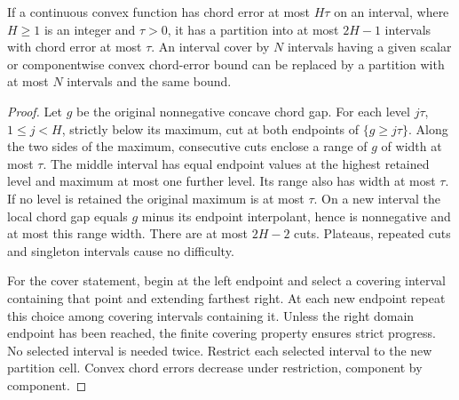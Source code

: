 \begin{lemma}\label{lem:level-refinement}
If a continuous convex function has chord error at most $H\tau$ on an
interval, where $H\ge1$ is an integer and $\tau>0$, it has a partition
into at most $2H-1$ intervals with chord error at most $\tau$.
An interval cover by $N$ intervals having a given scalar or componentwise
convex chord-error bound can be replaced by a partition with at most
$N$ intervals and the same bound.
\end{lemma}
\begin{proof}
Let $g$ be the original nonnegative concave chord gap. For each level
$j\tau$, $1\le j<H$, strictly below its maximum, cut at both endpoints
of $\{g\ge j\tau\}$. Along the two sides of the maximum, consecutive
cuts enclose a range of $g$ of width at most $\tau$. The middle interval
has equal endpoint values at the highest retained level and maximum
at most one further level. Its range also has width at most $\tau$.
If no level is retained the original maximum is at most $\tau$.
On a new interval the local chord gap equals $g$ minus its endpoint
interpolant, hence is nonnegative and at most this range width.
There are at most $2H-2$ cuts. Plateaus, repeated cuts and singleton
intervals cause no difficulty.

For the cover statement, begin at the left endpoint and select a covering
interval containing that point and extending farthest right. At each new
endpoint repeat this choice among covering intervals containing it.
Unless the right domain endpoint has been reached, the finite covering
property ensures strict progress. No selected interval is needed twice.
Restrict each selected interval to the new partition cell. Convex chord
errors decrease under restriction, component by component.
\end{proof}

